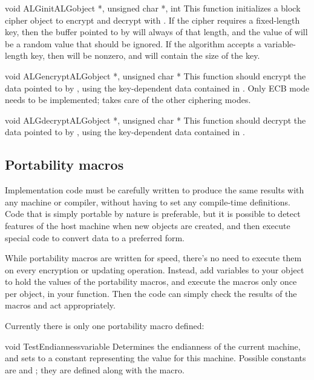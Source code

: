 \documentclass{howto}
\begin{document}
\begin{funcdesc}{void ALGinit}{\rm ALGobject *, unsigned char *, int }
This function initializes a block cipher object to encrypt and decrypt
with .  If the cipher requires a fixed-length key, then the
buffer pointed to by  will always of that length, and the
value of  will be a random value that should be ignored.
If the algorithm accepts a variable-length key, then  will
be nonzero, and will contain the size of the key.
\end{funcdesc}

\begin{funcdesc}{void ALGencrypt}{\rm ALGobject *, unsigned char *}
This function should encrypt the data pointed to by , using
the key-dependent data contained in .  Only ECB mode needs
to be implemented;  takes care of the other
ciphering modes.
\end{funcdesc}

\begin{funcdesc}{void ALGdecrypt}{\rm ALGobject *, unsigned char *}
This function should decrypt the data pointed to by , using
the key-dependent data contained in .
\end{funcdesc}

\subsection{Portability macros}

Implementation code must be carefully written to produce the same
results with any machine or compiler, without having to set any
compile-time definitions.  Code that is simply portable by nature is
preferable, but it is possible to detect features of the host machine
when new objects are created, and then execute special code to convert
data to a preferred form.

While portability macros are written for speed, there's no need to
execute them on every encryption or updating operation.  Instead, add
variables to your object to hold the values of the portability macros,
and execute the macros only once per object, in your
 function.  Then the code can simply check the
results of the macros and act appropriately.

Currently there is only one portability macro defined:

\begin{funcdesc}{void TestEndianness}{variable}
Determines the endianness of the current machine, and sets
 to a constant representing the value for this machine.
Possible constants are  and ;
they are defined along with the  macro.
\end{funcdesc}
\end{document}
